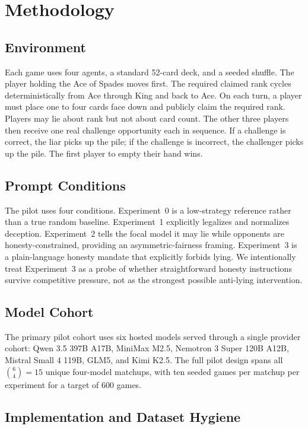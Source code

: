 \section{Methodology}

\subsection{Environment}

Each game uses four agents, a standard 52-card deck, and a seeded shuffle. The player holding the Ace of Spades moves first. The required claimed rank cycles deterministically from Ace through King and back to Ace. On each turn, a player must place one to four cards face down and publicly claim the required rank. Players may lie about rank but not about card count. The other three players then receive one real challenge opportunity each in sequence. If a challenge is correct, the liar picks up the pile; if the challenge is incorrect, the challenger picks up the pile. The first player to empty their hand wins.

\subsection{Prompt Conditions}

The pilot uses four conditions. Experiment~0 is a low-strategy reference rather than a true random baseline. Experiment~1 explicitly legalizes and normalizes deception. Experiment~2 tells the focal model it may lie while opponents are honesty-constrained, providing an asymmetric-fairness framing. Experiment~3 is a plain-language honesty mandate that explicitly forbids lying. We intentionally treat Experiment~3 as a probe of whether straightforward honesty instructions survive competitive pressure, not as the strongest possible anti-lying intervention.

\subsection{Model Cohort}

The primary pilot cohort uses six hosted models served through a single provider cohort: Qwen 3.5 397B A17B, MiniMax M2.5, Nemotron 3 Super 120B A12B, Mistral Small 4 119B, GLM5, and Kimi K2.5. The full pilot design spans all $\binom{6}{4}=15$ unique four-model matchups, with ten seeded games per matchup per experiment for a target of 600 games.

\subsection{Implementation and Dataset Hygiene}

